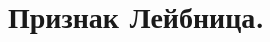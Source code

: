 \documentclass[../main.tex]{subfiles}
\begin{document}
\newpage
\section{Признак Лейбница.}
\end{document}
